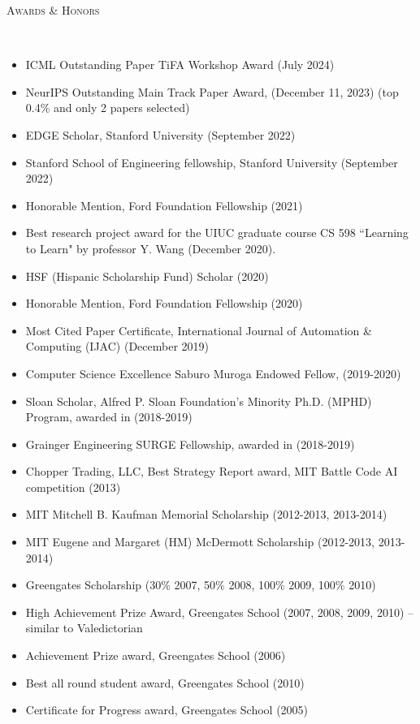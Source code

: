 \documentclass{article}
\newenvironment{changemargin}[2]{%
  \begin{list}{}{%
    \setlength{\topsep}{0pt}%
    \setlength{\leftmargin}{#1}%
    \setlength{\rightmargin}{#2}%
    \setlength{\listparindent}{\parindent}%
    \setlength{\itemindent}{\parindent}%
    \setlength{\parsep}{\parskip}%
  }%
  \item[]}{\end{list}
}
\newcommand{\lineover}{
	\begin{changemargin}{-0.05in}{-0.05in}
		\vspace*{-8pt}
		\hrulefill \\
		\vspace*{-2pt}
	\end{changemargin}
}
\newcommand{\header}[1]{
	\begin{changemargin}{-0.5in}{-0.5in}
		\scshape{#1}\\
  	\lineover
	\end{changemargin}
}
\newenvironment{body} {
	\vspace*{-16pt}
	\begin{changemargin}{-0.25in}{-0.5in}
  }	
	{\end{changemargin}
}
\begin{document}
\header{Awards \& Honors}
\begin{body}
\vspace{16pt}
\begin{itemize} \itemsep -2pt
    \item ICML Outstanding Paper TiFA Workshop Award (July 2024)
    \item NeurIPS Outstanding Main Track Paper Award, (December 11, 2023) (top 0.4\% and only 2 papers selected)
    \item EDGE Scholar, Stanford University (September 2022)
    \item Stanford School of Engineering fellowship, Stanford University (September 2022)
    \item Honorable Mention, Ford Foundation Fellowship (2021)
    \item Best research project award for the UIUC graduate course CS 598 ``Learning to Learn" by professor Y. Wang (December 2020).
    \item HSF (Hispanic Scholarship Fund) Scholar (2020)
    \item Honorable Mention, Ford Foundation Fellowship (2020)
    \item Most Cited Paper Certificate, International Journal of Automation \& Computing (IJAC) (December 2019)
    \item Computer Science Excellence Saburo Muroga Endowed Fellow, (2019-2020)
	\item Sloan Scholar, Alfred P. Sloan Foundation’s Minority Ph.D. (MPHD) Program, awarded in (2018-2019)
	\item Grainger Engineering SURGE Fellowship, awarded in (2018-2019)
	\item Chopper Trading, LLC, Best Strategy Report award, MIT Battle Code AI competition (2013)
	\item MIT Mitchell B. Kaufman Memorial Scholarship (2012-2013, 2013-2014)
	\item MIT Eugene and Margaret (HM) McDermott Scholarship (2012-2013, 2013-2014)
 	\item Greengates Scholarship (30\% 2007, 50\% 2008, 100\% 2009, 100\% 2010)
	\item High Achievement Prize Award, Greengates School (2007, 2008, 2009, 2010) -- similar to Valedictorian
        \item Achievement Prize award, Greengates School (2006)
	\item Best all round student award, Greengates School (2010)
	\item Certificate for Progress award, Greengates School (2005)
\end{itemize}
\end{body}
\end{document}
